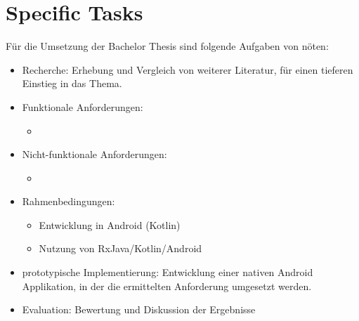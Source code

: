 \section{Specific Tasks}
\label{sec:specific-tasks}

Für die Umsetzung der Bachelor Thesis sind folgende Aufgaben von nöten:
%
\begin{itemize}
    \item Recherche: Erhebung und Vergleich von weiterer Literatur, für einen tieferen Einstieg in das Thema.
    \item Funktionale Anforderungen: 
        \begin{itemize}
        	\item
        \end{itemize}
    \item Nicht-funktionale Anforderungen:
    \begin{itemize}
    	\item 
    \end{itemize}
    \item Rahmenbedingungen:
    \begin{itemize}
        \item Entwicklung in Android (Kotlin)
        \item Nutzung von RxJava/Kotlin/Android
    \end{itemize}
    \item prototypische Implementierung: Entwicklung einer nativen Android Applikation, in der 
    die ermittelten Anforderung umgesetzt werden.
    \item Evaluation: Bewertung und Diskussion der Ergebnisse
\end{itemize}